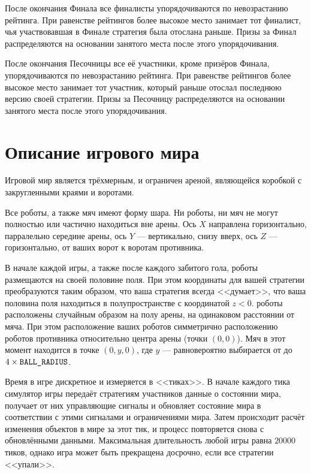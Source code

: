 После окончания Финала все финалисты упорядочиваются по невозрастанию рейтинга.
При равенстве рейтингов более высокое место занимает тот финалист,
чья участвовавшая в Финале стратегия была отослана раньше.
Призы за Финал распределяются на основании занятого места после этого
упорядочивания.

После окончания Песочницы все её участники, кроме призёров Финала, упорядочиваются по невозрастанию рейтинга.
При равенстве рейтингов более высокое место занимает тот участник,
который раньше отослал последнюю версию своей стратегии.
Призы за Песочницу распределяются на основании занятого места после этого упорядочивания.

\section{Описание игрового мира}

Игровой мир является трёхмерным, и ограничен ареной, являющейся коробкой с закругленными краями и воротами.

Все роботы, а также мяч имеют форму шара. Ни роботы, ни мяч не могут полностью или частично находиться вне арены.
Ось $X$ направлена горизонтально, парралельно середине арены,
ось $Y$ --- вертикально, снизу вверх,
ось $Z$ --- горизонтально, от ваших ворот к воротам противника.

В начале каждой игры, а также после каждого забитого гола, роботы размещаются на своей половине поля.
При этом координаты для вашей стратегии преобразуются таким образом, что ваша стратегия всегда <<думает>>,
что ваша половина поля находиться в полупространстве с координатой $z < 0$.
роботы расположены случайным образом на полу арены, на одинаковом расстоянии от мяча.
При этом расположение ваших роботов симметрично расположению роботов противника относительно центра арены (точки $(0, 0)$).
Мяч в этот момент находится в точке $(0, y, 0)$, где $y$ ---
равновероятно выбирается от  до $4\times\texttt{BALL\_RADIUS}$.

Время в игре дискретное и измеряется в <<тиках>>.
В начале каждого тика симулятор игры передаёт стратегиям участников данные о состоянии мира,
получает от них управляющие сигналы и обновляет состояние мира в соответствии с этими сигналами и ограничениями мира.
Затем происходит расчёт изменения объектов в мире за этот тик, и процесс повторяется снова с обновлёнными данными.
Максимальная длительность любой игры равна $20000$ тиков, однако игра может быть прекращена досрочно, если все стратегии <<упали>>.

